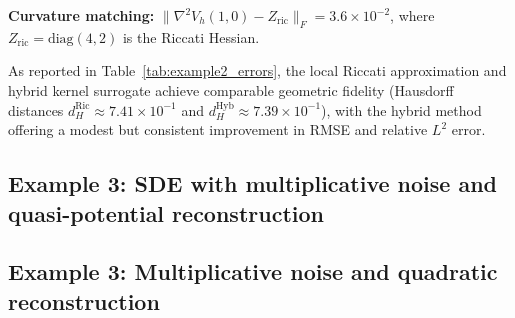 \documentclass[11pt]{article}
\theoremstyle{plain}      %
\theoremstyle{definition} %
\providecommand{\DIFaddtex}[1]{{\protect\color{blue}#1}} %
\providecommand{\DIFdeltex}[1]{{\protect\color{red}#1}} %
\providecommand{\DIFaddbegin}{} %
\providecommand{\DIFaddend}{} %
\providecommand{\DIFdelbegin}{} %
\providecommand{\DIFdelend}{} %
\providecommand{\DIFadd}[1]{\texorpdfstring{\DIFaddtex{#1}}{#1}} %
\providecommand{\DIFdel}[1]{\texorpdfstring{\DIFdeltex{#1}}{}} %
\newcommand{\DIFscaledelfig}{1.0}
\newlength{\DIFdelgraphicswidth} %
\newlength{\DIFdelgraphicsheight} %
\newcommand{\DIFaddincludegraphics}[2][]{{\color{blue}\fbox{\DIFOincludegraphics[#1]{#2}}}} %
\newcommand{\DIFdelincludegraphics}[2][]{%
\sbox{\DIFdelgraphicsbox}{\DIFOincludegraphics[#1]{#2}}%
\settoboxwidth{\DIFdelgraphicswidth}{\DIFdelgraphicsbox} %
\settoboxtotalheight{\DIFdelgraphicsheight}{\DIFdelgraphicsbox} %
\scalebox{\DIFscaledelfig}{%
\parbox[b]{\DIFdelgraphicswidth}{\usebox{\DIFdelgraphicsbox}\\[-\baselineskip] \rule{\DIFdelgraphicswidth}{0em}}\llap{\resizebox{\DIFdelgraphicswidth}{\DIFdelgraphicsheight}{%
\setlength{\unitlength}{\DIFdelgraphicswidth}%
\begin{picture}(1,1)%
\thicklines\linethickness{2pt} %
{\color[rgb]{1,0,0}\put(0,0){\framebox(1,1){}}}%
{\color[rgb]{1,0,0}\put(0,0){\line( 1,1){1}}}%
{\color[rgb]{1,0,0}\put(0,1){\line(1,-1){1}}}%
\end{picture}%
}\hspace*{3pt}}} %
} %
\DeclareRobustCommand{\DIFaddbegin}{\DIFOaddbegin \let\includegraphics\DIFaddincludegraphics} %
\DeclareRobustCommand{\DIFaddend}{\DIFOaddend \let\includegraphics\DIFOincludegraphics} %
\DeclareRobustCommand{\DIFdelbegin}{\DIFOdelbegin \let\includegraphics\DIFdelincludegraphics} %
\DeclareRobustCommand{\DIFdelend}{\DIFOaddend \let\includegraphics\DIFOincludegraphics} %
\begin{document}
\DIFdel{\textbf{Curvature matching:} $\|\nabla^2 V_h(1,0) - Z_{\text{ric}}\|_F = 3.6 \times 10^{-2}$, where $Z_{\text{ric}} = \text{diag}(4, 2)$ is the Riccati Hessian.
}%

\DIFdel{As reported in Table~\ref{tab:example2_errors}, the local Riccati approximation and hybrid kernel surrogate achieve comparable geometric fidelity (Hausdorff distances $d_H^{\text{Ric}} \approx 7.41 \times 10^{-1}$ and $d_H^{\text{Hyb}} \approx 7.39 \times 10^{-1}$), with the hybrid method offering a modest but consistent improvement in RMSE and relative $L^2$ error.
}%

\subsection{\DIFdel{Example 3: SDE with multiplicative noise and quasi-potential reconstruction}}
\addtocounter{subsection}{-1}%
\DIFdelend \DIFaddbegin \subsection{\DIFadd{Example 3: Multiplicative noise and quadratic reconstruction}}\DIFaddend \label{sec:example3_kernels}
\DIFdelbegin %
\end{document}
